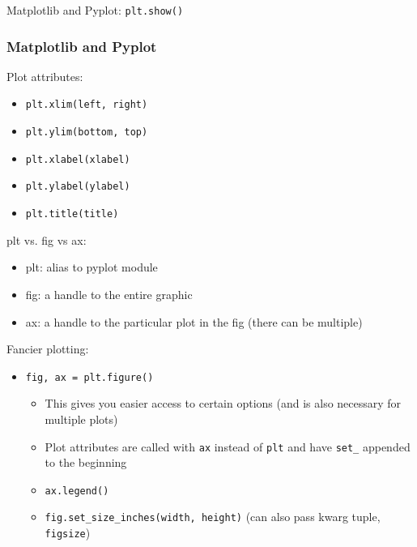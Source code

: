 \documentclass{beamer}
\newcommand{\code}[1]{\texttt{#1}}
\begin{document}
\begin{frame}
\begin{block}{Matplotlib and Pyplot:}
		\vspace{10pt}
		\code{plt.show()}
	\end{block}
	
\end{frame}

\begin{frame}	
	\frametitle{Matplotlib and Pyplot}

		\begin{block}{Plot attributes:}
			\begin{itemize}
				\footnotesize
				\item \texttt{plt.xlim(left, right)}
				\item \texttt{plt.ylim(bottom, top)}
				\item \texttt{plt.xlabel(xlabel)}
				\item \texttt{plt.ylabel(ylabel)}
				\item \texttt{plt.title(title)}
			\end{itemize}
		\end{block}
	\endminipage\hfill
	\endminipage\hfill	
		\begin{block}{plt vs. fig vs ax:}
			\begin{itemize}
				\footnotesize
				\item plt: alias to pyplot module
				\item fig: a handle to the entire graphic
				\item ax: a handle to the particular plot in the fig (there can be multiple)
			\end{itemize}
		\end{block}
	\endminipage\hfill
	
	\begin{block}{Fancier plotting:}
		\begin{itemize}
	         \footnotesize
			\item \code{fig, ax = plt.figure()}
			\begin{itemize}
		         \footnotesize
				\item This gives you easier access to certain options (and is also necessary for multiple plots)
				\item Plot attributes are called with \code{ax} instead of \code{plt} and have \code{set\_} appended to the beginning
				\item \code{ax.legend()}
				\item \code{fig.set\_size\_inches(width, height)} (can also pass kwarg tuple, \code{figsize})
			\end{itemize}
		\end{itemize}
	\end{block}
	
\end{frame}
\end{document}
